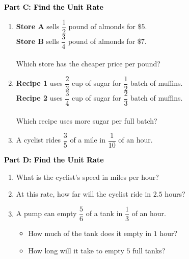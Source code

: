 \documentclass[12pt, letterpaper, fleqn]{article}
\begin{document}
\newpage

\begin{tcolorbox}[colback=customteal!20]
\large\textcolor{black}{\textbf{Part C: Find the Unit Rate}}
\end{tcolorbox}

\vspace{3mm}

\begin{enumerate}[itemsep=2.5cm, leftmargin=0.6cm, resume]
\item \textbf{Store A} sells $\dfrac{1}{2}$ pound of almonds for $\$5$. \\
\textbf{Store B} sells $\dfrac{3}{4}$ pound of almonds for $\$7$. \\ \\
Which store has the cheaper price per pound?
\item \textbf{Recipe 1} uses $\dfrac{2}{3}$ cup of sugar for $\dfrac{1}{2}$ batch of muffins. \\
\textbf{Recipe 2} uses $\dfrac{3}{4}$ cup of sugar for $\dfrac{2}{3}$ batch of muffins. \\ \\
Which recipe uses more sugar per full batch?
\item A cyclist rides $\dfrac{3}{5}$ of a mile in $\dfrac{1}{10}$ of an hour. 
\end{enumerate}

\newpage

\begin{tcolorbox}[colback=customteal!20]
\large\textcolor{black}{\textbf{Part D: Find the Unit Rate}}
\end{tcolorbox}

\vspace{3mm}

\begin{enumerate}[itemsep=2.5cm, leftmargin=0.6cm, resume]
\item What is the cyclist's speed in miles per hour?
\item At this rate, how far will the cyclist ride in $2.5$ hours?
\item A pump can empty $\dfrac{5}{6}$ of a tank in $\dfrac{1}{3}$ of an hour.
\begin{itemize}
\item How much of the tank does it empty in $1$ hour?
\item How long will it take to empty $5$ full tanks?
\end{itemize}
\end{enumerate}
\end{document}
